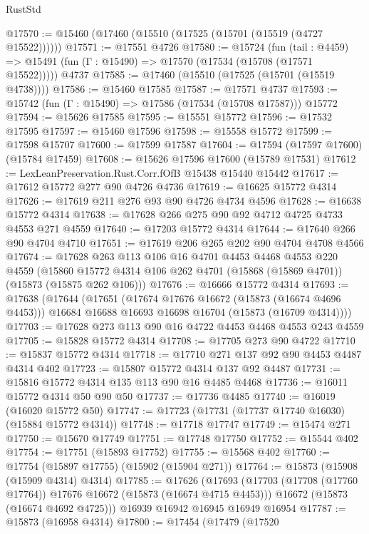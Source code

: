 \begin{lexlean}{RustStd}
\begin{coremodule}
@17570 := @15460 (@17460 (@15510 (@17525 (@15701 (@15519 (@4727 @15522))))))
@17571 := @17551 @4726
@17580 := @15724
    (fun (tail : @4459) => @15491 (fun (Γ : @15490) => @17570 (@17534 (@15708 (@17571 @15522)))))
    @4737
@17585 := @17460 (@15510 (@17525 (@15701 (@15519 @4738))))
@17586 := @15460 @17585
@17587 := @17571 @4737
@17593 := @15742 (fun (Γ : @15490) => @17586 (@17534 (@15708 @17587))) @15772
@17594 := @15626 @17585
@17595 := @15551 @15772
@17596 := @17532 @17595
@17597 := @15460 @17596
@17598 := @15558 @15772
@17599 := @17598 @15707
@17600 := @17599 @17587
@17604 := @17594 (@17597 @17600) (@15784 @17459)
@17608 := @15626 @17596 @17600 (@15789 @17531)
@17612 := LexLeanPreservation.Rust.Corr.fOfB @15438 @15440 @15442
@17617 := @17612 @15772 @277 @90 @4726 @4736
@17619 := @16625 @15772 @4314
@17626 := @17619 @211 @276 @93 @90 @4726 @4734 @4596
@17628 := @16638 @15772 @4314
@17638 := @17628 @266 @275 @90 @92 @4712 @4725 @4733 @4553 @271 @4559
@17640 := @17203 @15772 @4314
@17644 := @17640 @266 @90 @4704 @4710
@17651 := @17619 @206 @265 @202 @90 @4704 @4708 @4566
@17674 := @17628
    @263
    @113
    @106
    @16
    @4701
    @4453
    @4468
    @4553
    @220
    @4559
    (@15860 @15772 @4314 @106 @262 @4701 (@15868 (@15869 @4701)) (@15873 (@15875 @262 @106)))
@17676 := @16666 @15772 @4314
@17693 := @17638
    (@17644
      (@17651
        (@17674 @17676 @16672 (@15873 (@16674 @4696 @4453)))
        @16684
        @16688
        @16693
        @16698
        @16704
        (@15873 (@16709 @4314))))
@17703 := @17628 @273 @113 @90 @16 @4722 @4453 @4468 @4553 @243 @4559
@17705 := @15828 @15772 @4314
@17708 := @17705 @273 @90 @4722
@17710 := @15837 @15772 @4314
@17718 := @17710 @271 @137 @92 @90 @4453 @4487 @4314 @402
@17723 := @15807 @15772 @4314 @137 @92 @4487
@17731 := @15816 @15772 @4314 @135 @113 @90 @16 @4485 @4468
@17736 := @16011 @15772 @4314 @50 @90 @50
@17737 := @17736 @4485
@17740 := @16019 (@16020 @15772 @50)
@17747 := @17723 (@17731 (@17737 @17740 @16030) (@15884 @15772 @4314))
@17748 := @17718 @17747
@17749 := @15474 @271
@17750 := @15670 @17749
@17751 := @17748 @17750
@17752 := @15544 @402
@17754 := @17751 (@15893 @17752)
@17755 := @15568 @402
@17760 := @17754 (@15897 @17755) (@15902 (@15904 @271))
@17764 := @15873 (@15908 (@15909 @4314) @4314)
@17785 := @17626
    (@17693
      (@17703 (@17708 (@17760 @17764)) @17676 @16672 (@15873 (@16674 @4715 @4453)))
      @16672
      (@15873 (@16674 @4692 @4725)))
    @16939
    @16942
    @16945
    @16949
    @16954
@17787 := @15873 (@16958 @4314)
@17800 := @17454
    (@17479
      (@17520

\end{coremodule}
\end{lexlean}
